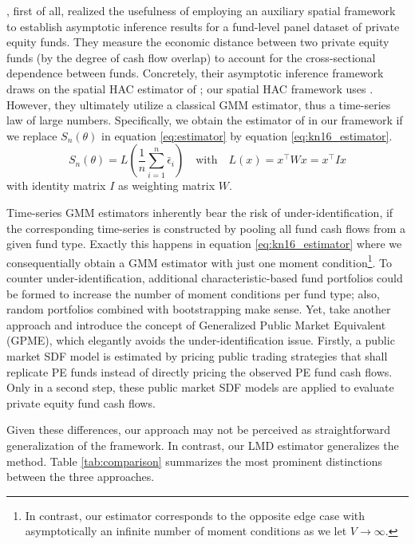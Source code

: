 \documentclass[12pt]{article}
\begin{document}
\cite{KN16}, first of all, realized the usefulness of employing an auxiliary spatial framework to establish asymptotic inference results for a fund-level panel dataset of private equity funds.
They measure the economic distance between two private equity funds (by the degree of cash flow overlap) to account for the cross-sectional dependence between funds.
Concretely, their asymptotic inference framework draws on the spatial HAC estimator of \cite{C99}; our spatial HAC framework uses \cite{PP97,KS11,JP12}.
However, they ultimately utilize a classical GMM estimator, thus a time-series law of large numbers.
Specifically, we obtain the estimator of \cite[equation 18]{KN16} in our framework if we replace $S_n(\theta)$ in equation \ref{eq:estimator} by equation \ref{eq:kn16_estimator}.
\begin{equation}
\label{eq:kn16_estimator}
	S_n(\theta) = 
	L \left( 
	\frac{1}{n}
	\sum_{i=1}^n
	\bar{\epsilon}_{i} 
	\right)
	\quad
	\mathrm{with}
	\quad
	L(x) = x^{\top} W x = x^{\top} I x
\end{equation}
with identity matrix $I$ as weighting matrix $W$.

Time-series GMM estimators inherently bear the risk of under-identification, if the corresponding time-series is constructed by pooling all fund cash flows from a given fund type.
Exactly this happens in equation \ref{eq:kn16_estimator} where we consequentially obtain a GMM estimator with just one moment condition\footnote{In contrast, our estimator corresponds to the opposite edge case with asymptotically an infinite number of moment conditions as we let $V \to \infty$.}.
To counter under-identification, additional characteristic-based fund portfolios could be formed to increase the number of moment conditions per fund type; also, random portfolios combined with bootstrapping make sense.
Yet, \cite{KN16} take another approach and introduce the concept of Generalized Public Market Equivalent (GPME), which elegantly avoids the under-identification issue.
Firstly, a public market SDF model is estimated by pricing public trading strategies that shall replicate PE funds instead of directly pricing the observed PE fund cash flows.
Only in a second step, these public market SDF models are applied to evaluate private equity fund cash flows.

Given these differences, our approach may not be perceived as straightforward generalization of the \cite{KN16} framework.
In contrast, our LMD estimator generalizes the \cite{DLP12} method. 
Table \ref{tab:comparison} summarizes the most prominent distinctions between the three approaches.
\end{document}
